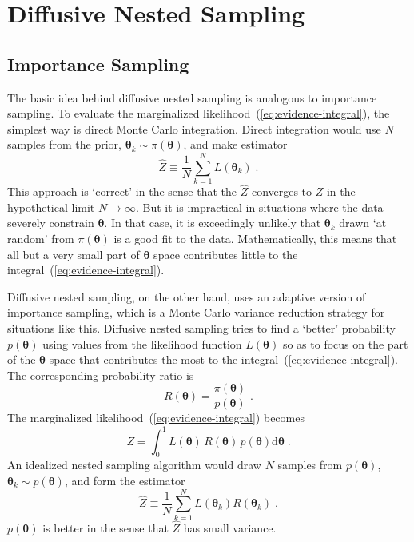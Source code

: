 \documentclass[letterpaper, preprint]{aastex}
\newcommand{\bth} {\boldsymbol \theta}
\newcommand{\md}{\mathrm{d}}
\begin{document}
\section{Diffusive Nested Sampling}
\label{sec:dns}

\subsection{Importance Sampling}

The basic idea behind diffusive nested sampling is analogous to importance sampling. To evaluate the marginalized likelihood~(\ref{eq:evidence-integral}), the simplest way is direct Monte Carlo integration. Direct integration would use $N$ samples from the prior, $\bth_k\sim\pi(\bth)$, and make estimator
\begin{equation}
\widehat{Z} \equiv \frac{1}{N}\sum_{k=1}^N L(\bth_k)\;.
\end{equation}
This approach is `correct' in the sense that the $\widehat{Z}$ converges to $Z$ in the hypothetical limit $N\to\infty$. But it is impractical in situations where the data severely constrain $\bth$. In that case, it is exceedingly unlikely that $\bth_k$ drawn `at random' from $\pi(\bth)$ is a good fit to the data. Mathematically, this means that all but a very small part of $\bth$ space contributes little to the integral~(\ref{eq:evidence-integral}).

Diffusive nested sampling, on the other hand, uses an adaptive version of importance sampling, which is a Monte Carlo variance reduction strategy for situations like this. Diffusive nested sampling tries to find a `better' probability $p(\bth)$ using values from the likelihood function $L(\bth)$ so as to focus on the part of the $\bth$ space that contributes the most to the integral~(\ref{eq:evidence-integral}). The corresponding probability ratio is
\begin{equation}
R(\bth) = \frac{\pi(\bth)}{p(\bth)}\; .
\end{equation}
The marginalized likelihood~(\ref{eq:evidence-integral}) becomes
\begin{equation}
Z=\int^1_0\! L(\bth)\,R(\bth)\,p(\bth)\md\bth \;.
\label{eq:evidence-integral-importance}
\end{equation}
An idealized nested sampling algorithm would draw $N$ samples from $p(\bth)$, $\bth_k \sim p(\bth)$, and form the estimator
\begin{equation}
\widehat{Z} \equiv \frac{1}{N}\sum_{k=1}^N L(\bth_k)R(\bth_k)\;.
\label{eq:evidence-sum-importance}
\end{equation}
$p(\bth)$ is better in the sense that $\widehat{Z}$ has small variance. 
\end{document}
